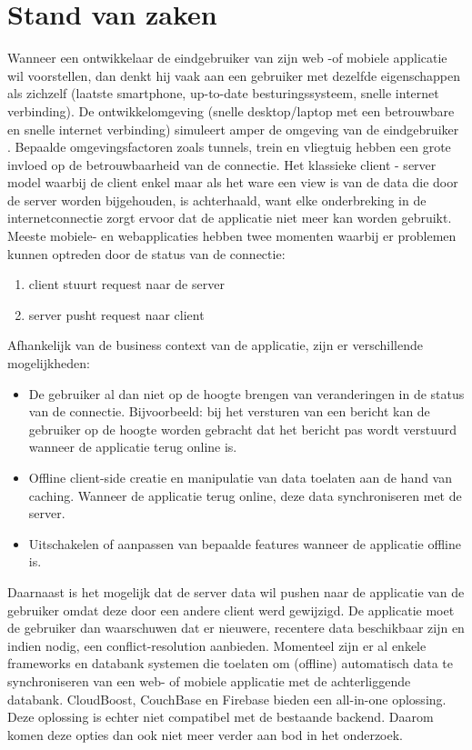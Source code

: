 \section{Stand van zaken}
\label{sec:stand-van-zaken}
Wanneer een ontwikkelaar de eindgebruiker van zijn web -of mobiele applicatie wil voorstellen, dan denkt hij vaak aan een gebruiker met dezelfde eigenschappen als zichzelf (laatste smartphone, up-to-date besturingssysteem,  snelle internet verbinding). De ontwikkelomgeving (snelle desktop/laptop met een betrouwbare en snelle internet verbinding) simuleert amper de omgeving van de eindgebruiker \autocite{chrome-offline-first-statement}. Bepaalde omgevingsfactoren zoals tunnels, trein en vliegtuig hebben een grote invloed op de betrouwbaarheid van de connectie. Het klassieke client - server model waarbij de client enkel maar als het ware een view is van de data die door de server worden bijgehouden, is achterhaald, want elke onderbreking in de internetconnectie zorgt ervoor dat de applicatie niet meer kan worden gebruikt.
\clearpage
Meeste mobiele- en webapplicaties hebben twee momenten waarbij er problemen kunnen optreden door de status van de connectie:
\begin{enumerate}  
\item client stuurt request naar de server
\item server pusht request naar client
\end{enumerate}
Afhankelijk van de business context van de applicatie, zijn er verschillende mogelijkheden:
\begin{itemize}  
\item De gebruiker al dan niet op de hoogte brengen van veranderingen in de status van de connectie. Bijvoorbeeld: bij het versturen van een bericht kan de gebruiker op de hoogte worden gebracht dat het bericht pas wordt verstuurd wanneer de applicatie terug online is.
\item Offline client-side creatie en manipulatie van data toelaten aan de hand van caching. Wanneer de applicatie terug online, deze data synchroniseren met de server.
\item Uitschakelen of aanpassen van bepaalde features wanneer de applicatie offline is.
\end{itemize}
Daarnaast is het mogelijk dat de server data wil pushen naar de applicatie van de gebruiker omdat deze door een andere client werd gewijzigd. De applicatie moet de gebruiker dan waarschuwen dat er nieuwere, recentere data beschikbaar zijn en indien nodig, een conflict-resolution aanbieden. Momenteel zijn er al enkele frameworks en databank systemen die toelaten om (offline) automatisch data te synchroniseren van een web- of mobiele applicatie met de achterliggende databank. CloudBoost, CouchBase en Firebase bieden een all-in-one oplossing. Deze oplossing is echter niet compatibel met de bestaande backend. Daarom komen deze opties dan ook niet meer verder aan bod in het onderzoek.
